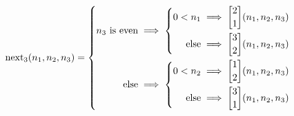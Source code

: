 	\begin{equation*}\begin{split} %
		\myop{next}_3(n_1,n_2,n_3) = \left\{\begin{split}
			n_3\text{ is even} &\implies \left\{\begin{split}
				0< n_1 &\implies \move{2}{1}(n_1,n_2,n_3) \\
				\text{else} &\implies \move{3}{2}(n_1,n_2,n_3) \\
			\end{split}\right. \\ %
			\text{else} &\implies \left\{\begin{split}
				0< n_2 &\implies \move{1}{2}(n_1,n_2,n_3) \\
				\text{else} &\implies \move{3}{1}(n_1,n_2,n_3) \\
			\end{split}\right. \\ %
		\end{split}\right. \\ %
	\end{split}\end{equation*} %

